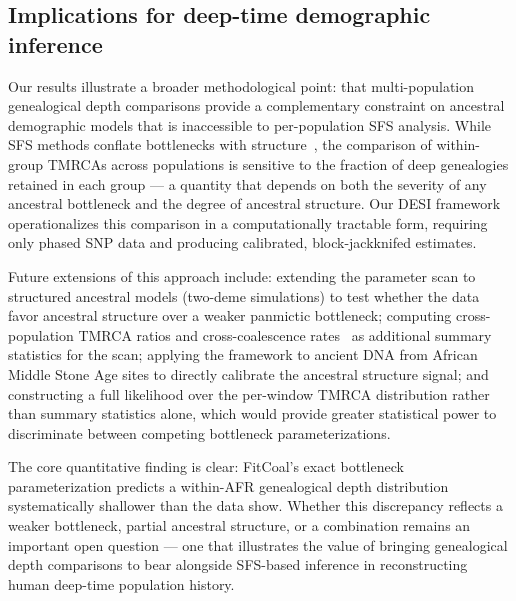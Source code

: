 \subsection*{Implications for deep-time demographic inference}

Our results illustrate a broader methodological point: that multi-population genealogical depth comparisons provide a complementary constraint on ancestral demographic models that is inaccessible to per-population SFS analysis. While SFS methods conflate bottlenecks with structure~\citep{Cousins2025b,Myers2008}, the comparison of within-group TMRCAs across populations is sensitive to the fraction of deep genealogies retained in each group --- a quantity that depends on both the severity of any ancestral bottleneck and the degree of ancestral structure. Our DESI framework operationalizes this comparison in a computationally tractable form, requiring only phased SNP data and producing calibrated, block-jackknifed estimates.

Future extensions of this approach include: extending the parameter scan to structured ancestral models (two-deme simulations) to test whether the data favor ancestral structure over a weaker panmictic bottleneck; computing cross-population TMRCA ratios and cross-coalescence rates~\citep{Schiffels2014} as additional summary statistics for the scan; applying the framework to ancient DNA from African Middle Stone Age sites to directly calibrate the ancestral structure signal; and constructing a full likelihood over the per-window TMRCA distribution rather than summary statistics alone, which would provide greater statistical power to discriminate between competing bottleneck parameterizations.

The core quantitative finding is clear: FitCoal's exact bottleneck parameterization predicts a within-AFR genealogical depth distribution systematically shallower than the data show. Whether this discrepancy reflects a weaker bottleneck, partial ancestral structure, or a combination remains an important open question --- one that illustrates the value of bringing genealogical depth comparisons to bear alongside SFS-based inference in reconstructing human deep-time population history.
